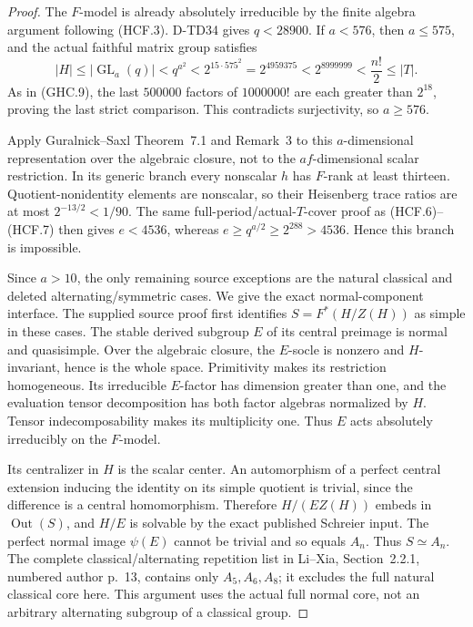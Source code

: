 \begin{proof}
The $F$-model is already absolutely irreducible by the finite
algebra argument following (HCF.3).  D-TD34 gives $q<28900$.
If $a<576$, then $a\le575$, and the actual faithful matrix
group satisfies
\[
 |H|\le|\operatorname{GL}_a(q)|<q^{a^2}
       <2^{15\cdot575^2}=2^{4959375}
       <2^{8999999}<\frac{n!}{2}\le|T|.
 \tag{HCF.14}
\]
As in (GHC.9), the last $500000$ factors of $1000000!$ are
each greater than $2^{18}$, proving the last strict comparison.
This contradicts surjectivity, so $a\ge576$.

Apply Guralnick--Saxl Theorem~7.1 and Remark~3 to this
$a$-dimensional representation over the algebraic closure, not
to the $af$-dimensional scalar restriction.\cite{BI:GS}
In its generic branch every nonscalar $h$ has $F$-rank at
least thirteen.  Quotient-nonidentity elements are nonscalar,
so their Heisenberg trace ratios are at most
$2^{-13/2}<1/90$.  The same full-period/actual-$T$-cover proof
as (HCF.6)--(HCF.7) then gives $e<4536$, whereas
$e\ge q^{a/2}\ge2^{288}>4536$.  Hence this branch is impossible.

Since $a>10$, the only remaining source exceptions are the natural
classical and deleted alternating/symmetric cases.  We give the
exact normal-component interface.  The supplied source proof first
identifies $S=F^*(H/Z(H))$ as simple in these cases.  The stable
derived subgroup $E$ of its central preimage is normal and
quasisimple.  Over the algebraic closure, the $E$-socle is
nonzero and $H$-invariant, hence is the whole space.  Primitivity
makes its restriction homogeneous.  Its irreducible $E$-factor
has dimension greater than one, and the evaluation tensor
decomposition has both factor algebras normalized by $H$.
Tensor indecomposability makes its multiplicity one.  Thus $E$
acts absolutely irreducibly on the $F$-model.

Its centralizer in $H$ is the scalar center.  An automorphism
of a perfect central extension inducing the identity on its
simple quotient is trivial, since the difference is a central
homomorphism.  Therefore $H/(EZ(H))$ embeds in
$\operatorname{Out}(S)$, and $H/E$ is solvable by the exact
published Schreier input.\cite[Theorem2.3, p.~1314]{HD:BabaiLuksSeress1997}
The perfect normal image $\psi(E)$ cannot be trivial and so
equals $A_n$.  Thus $S\simeq A_n$.
The complete classical/alternating repetition list in Li--Xia,
Section~2.2.1, numbered author p.~13, contains only $A_5,A_6,A_8$;
it excludes the full natural classical core here.\cite{HES:LiXia2022}
This argument uses the actual full normal core, not an arbitrary
alternating subgroup of a classical group.


\end{proof}

